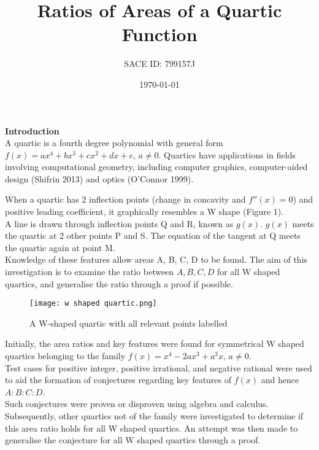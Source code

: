 \documentclass{homework}
\author{SACE ID: 799157J}
\title{\Large{Ratios of Areas of a Quartic Function}}
\date{\today}
\begin{document}
 \maketitle
   \textbf{\large{Introduction}} \vspace{1em}\\ 
A quartic is a fourth degree polynomial with general form $f(x)=ax^4+bx^3+cx^2+dx+e,\,a\neq 0$. Quartics have applications in fields involving computational geometry, including computer graphics, computer-aided design (Shifrin 2013) and optics (O’Connor 1999).  \vspace{0.8em}\\
\begin{paracol}{2}
 When a quartic has 2 inflection points (change in concavity and $f''(x)=0$) and positive leading coefficient, it graphically resembles a W shape (Figure 1). \vspace{0.8em}\\
 A line is drawn through inflection points Q and R, known as $g(x)$. $g(x)$ meets the quartic at 2 other points P and S. The equation of the tangent at Q meets the quartic again at point M. \vspace{0.8em}\\
Knowledge of these features allow areas A, B, C, D to be found. The aim of this investigation is to examine the ratio between $A, B, C, D$ for all W shaped quartics, and generalise the ratio through a proof if possible.
\switchcolumn
\begin{figure}[htp]
    \centering
    \texttt{[image: w shaped quartic.png]}
    \caption{A W-shaped quartic with all relevant points labelled}
    \label{fig:quartic}
\end{figure}
\end{paracol}
Initially, the area ratios and key features were found for symmetrical W shaped quartics belonging to the family $f(x)=x^4-2ax^3+a^3x,\,a\neq0$. \vspace{0.8em}\\
Test cases for positive integer, positive irrational, and negative rational were used to aid the formation of conjectures regarding key features of $f(x)$ and hence $A:B:C:D$. \vspace{0.8em}\\
Such conjectures were proven or disproven using algebra and calculus. 
Subsequently, other quartics not of the family were investigated to determine if this area ratio holds for all W shaped quartics. An attempt was then made to generalise the conjecture for all W shaped quartics through a proof.\\
\end{document}

